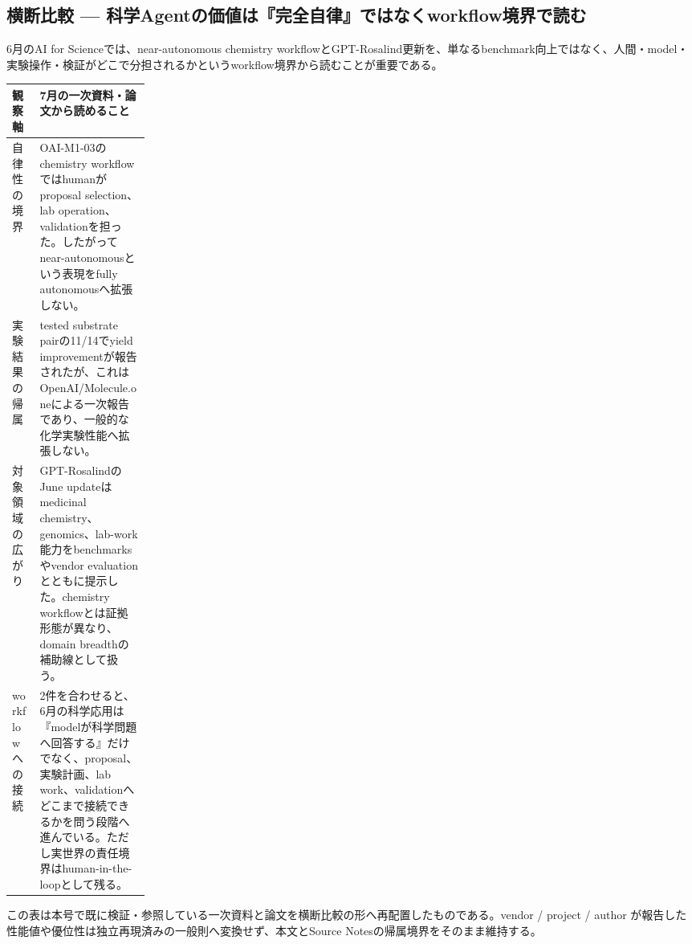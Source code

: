 \subsection*{横断比較 — 科学Agentの価値は『完全自律』ではなくworkflow境界で読む}
6月のAI for Scienceでは、near-autonomous chemistry workflowとGPT-Rosalind更新を、単なるbenchmark向上ではなく、人間・model・実験操作・検証がどこで分担されるかというworkflow境界から読むことが重要である。
\medskip
\begin{center}
\small
\renewcommand{\arraystretch}{1.16}
\begin{tabularx}{\linewidth}{@{}p{0.20\linewidth}X@{}}
\toprule
観察軸 & 7月の一次資料・論文から読めること \\
\midrule
自律性の境界 & OAI-M1-03のchemistry workflowではhumanがproposal selection、lab operation、validationを担った。したがってnear-autonomousという表現をfully autonomousへ拡張しない。 \cite{src-5ff2f715f1e6} \\
実験結果の帰属 & tested substrate pairの11/14でyield improvementが報告されたが、これはOpenAI/Molecule.oneによる一次報告であり、一般的な化学実験性能へ拡張しない。 \cite{src-5ff2f715f1e6} \\
対象領域の広がり & GPT-RosalindのJune updateはmedicinal chemistry、genomics、lab-work能力をbenchmarksやvendor evaluationとともに提示した。chemistry workflowとは証拠形態が異なり、domain breadthの補助線として扱う。 \cite{src-ba562226725d} \\
workflowへの接続 & 2件を合わせると、6月の科学応用は『modelが科学問題へ回答する』だけでなく、proposal、実験計画、lab work、validationへどこまで接続できるかを問う段階へ進んでいる。ただし実世界の責任境界はhuman-in-the-loopとして残る。 \cite{src-5ff2f715f1e6,src-ba562226725d} \\
\bottomrule
\end{tabularx}
\renewcommand{\arraystretch}{1.0}
\end{center}
\normalsize
\begin{claimboundary}[この比較の境界]
この表は本号で既に検証・参照している一次資料と論文を横断比較の形へ再配置したものである。vendor / project / author が報告した性能値や優位性は独立再現済みの一般則へ変換せず、本文とSource Notesの帰属境界をそのまま維持する。
\end{claimboundary}
